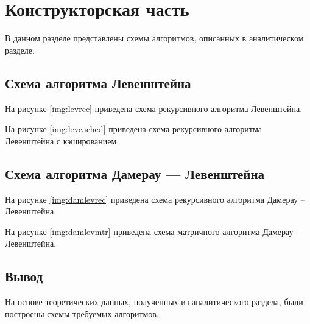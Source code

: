 \chapter{Конструкторская часть}

В данном разделе представлены схемы алгоритмов, описанных в аналитическом разделе.

\section{Схема алгоритма Левенштейна}

На рисунке \ref{img:levrec} приведена схема рекурсивного алгоритма Левенштейна.


\clearpage

На рисунке \ref{img:levcached} приведена схема рекурсивного алгоритма Левенштейна с кэшированием.


\clearpage

\section{Схема алгоритма Дамерау — Левенштейна}

На рисунке \ref{img:damlevrec} приведена схема рекурсивного алгоритма Дамерау -- Левенштейна.


\clearpage

На рисунке \ref{img:damlevmtr} приведена схема матричного алгоритма Дамерау -- Левенштейна.


\section{Вывод}

На основе теоретических данных, полученных из аналитического раздела, были построены схемы требуемых алгоритмов.
